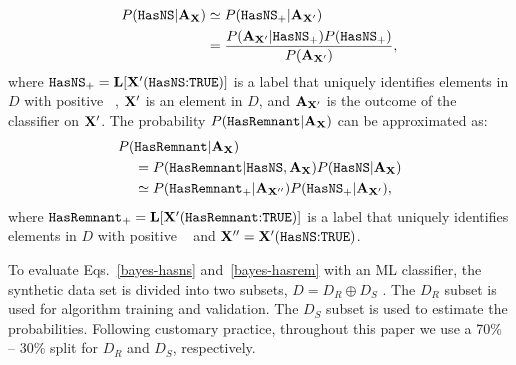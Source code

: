 \begin{align}
\label{bayes-hasns}
P({{\tt HasNS}}|{\bf A}_{\bf X})&\simeq P({{\tt HasNS}}_+|{\bf A}_{{\bf X}'}) \nonumber \\
&=\frac{P({\bf A}_{{\bf X}'}|{{\tt HasNS}}_+)P({{\tt HasNS}}_+)}{P({\bf A}_{{\bf X}'})},
\end{align}
%
where ${{\tt HasNS}}_+={\bf L}[{\bf X}'(\hbox{{{\tt HasNS}}:{{\tt TRUE}}})]$ is a label that uniquely identifies elements in $D$  with positive \tocheck{(+)} \hasns\ , ${\bf X}'$ is an element in $D$, and ${\bf A}_{{\bf X}'}$ is the outcome of the classifier on ${\bf X}'$.  The probability $P({{\tt HasRemnant}}|{\bf A}_{\bf X})$ can be approximated as:
%
\begin{align}
\label{bayes-hasrem}
P(&{{\tt HasRemnant}}|{\bf A}_{\bf X}) \nonumber  \\
&=P({{\tt HasRemnant}}|{{\tt HasNS}}, {\bf A}_{\bf X})P({{\tt HasNS}}|{\bf A}_{\bf X}) \nonumber \\
&\simeq P({{\tt HasRemnant}}_+|{\bf A}_{{\bf X}''})P({{\tt HasNS}}_+|{\bf A}_{{\bf X}'}),
\end{align}
where ${{\tt HasRemnant}}_+={\bf L}[{\bf X}'(\hbox{{{\tt HasRemnant}}:{{\tt TRUE}}})]$ is a label that uniquely identifies elements in $D$  with positive \tocheck{(+)} \hasrem\  and ${\bf X}''= {\bf X}'(\hbox{{{\tt HasNS}}:{{\tt TRUE}}})$.

To evaluate Eqs.~\eqref{bayes-hasns} and~\eqref{bayes-hasrem} with an \ac{ML} classifier, the synthetic data set is divided into two subsets, $D=D_R\oplus D_S$ . The $D_R$ subset is used
for algorithm training and validation. The $D_S$ subset is used to estimate the probabilities. Following customary practice, throughout this paper we use a 70\% -- 30\% split for $D_R$
and $D_S$, respectively.


